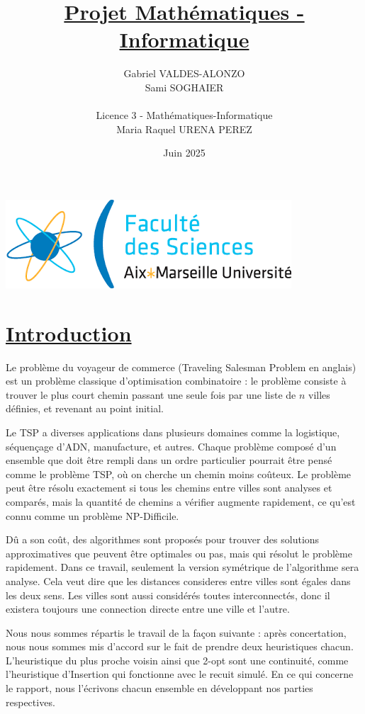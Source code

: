 \documentclass{article}
\title{\underline{Projet Mathématiques - Informatique}}
\author{Gabriel VALDES-ALONZO\\ Sami SOGHAIER  \\\\ Licence 3 - Mathématiques-Informatique \\ Maria Raquel URENA PEREZ }
\date{Juin 2025}
\begin{document}
\maketitle
\begin{center}
    \includegraphics[scale=0.7]{index.png}
\end{center}

\newpage

\section*{\underline{Introduction}}
Le problème du voyageur de commerce \cite{book:TSP,chap:TSP} (Traveling Salesman Problem en anglais) est un problème classique d’optimisation combinatoire : le problème consiste à trouver le plus court chemin passant une seule fois par une liste de $n$ villes définies, et revenant au point initial.

Le TSP a diverses applications dans plusieurs domaines comme la logistique, séquençage d'ADN, manufacture, et autres. Chaque problème composé d'un ensemble que doit être rempli dans un ordre particulier pourrait être pensé comme le problème TSP, où on cherche un chemin moins coûteux. Le problème peut être résolu exactement si tous les chemins entre villes sont analyses et comparés, mais la quantité de chemins a vérifier augmente rapidement, ce qu'est connu comme un problème NP-Difficile.

Dû a son coût, des algorithmes sont proposés pour trouver des solutions approximatives que peuvent être optimales ou pas, mais qui résolut le problème rapidement. Dans ce travail, seulement la version symétrique de l'algorithme sera analyse. Cela veut dire que les distances consideres entre villes sont égales dans les deux sens. Les villes sont aussi considérés toutes interconnectés, donc il existera toujours une connection directe entre une ville et l'autre.

Nous nous sommes répartis le travail de la façon suivante : après concertation, nous nous sommes mis d'accord sur le fait de prendre deux heuristiques chacun. L'heuristique du plus proche voisin ainsi que 2-opt sont une continuité, comme l'heuristique d'Insertion qui fonctionne avec le recuit simulé. 
En ce qui concerne le rapport, nous l'écrivons chacun ensemble en développant nos parties respectives.
\end{document}
